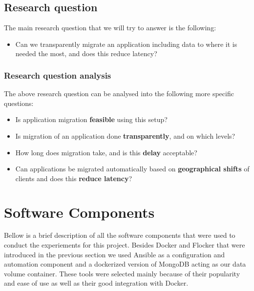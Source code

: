 \documentclass{article}
\begin{document}
\clearpage
\subsection{Research question}
The main research question that we will try to answer is the following:

\begin{itemize}
\item{Can we transparently migrate an application including data to where it is needed the most, and does this reduce latency?}
\end{itemize}

\subsubsection{Research question analysis}
The above research question can be analysed into the following more specific questions:
\begin{itemize}
\item{Is application migration \textbf{feasible} using this setup?}
\item{Is migration of an application done \textbf{transparently}, and on which levels?}
\item{How long does migration take, and is this \textbf{delay} acceptable?}
\item{Can applications be migrated automatically based on \textbf{geographical shifts} of clients and does this \textbf{reduce latency}?}
\end{itemize}



\clearpage
\section{Software Components}
Bellow is a brief description of all the software components that were used to conduct the experiements for this project. Besides Docker and Flocker that were introduced in the previous section we used Ansible as a configuration and automation component and a dockerized version of MongoDB acting as our data volume container. These tools were selected mainly because of their popularity and ease of use as well as their good integration with Docker.
\end{document}
